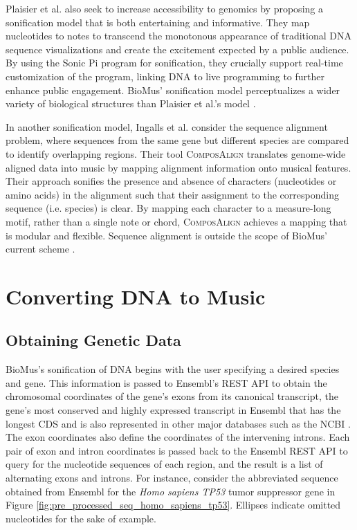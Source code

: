 \documentclass[letterpaper]{article}
\begin{document}
Plaisier et al. also seek to increase accessibility to genomics by proposing a sonification model that is both entertaining and informative. They map nucleotides to notes to transcend the monotonous appearance of traditional DNA sequence visualizations and create the excitement expected by a public audience. By using the Sonic Pi program for sonification, they crucially support real-time customization of the program, linking DNA to live programming to further enhance public engagement. BioMus’ sonification model perceptualizes a wider variety of biological structures than Plaisier et al.’s model \cite{plaisier_meagher_barker_2021}.

In another sonification model, Ingalls et al. consider the sequence alignment problem, where sequences from the same gene but different species are compared to identify overlapping regions. Their tool \textsc{ComposAlign} translates genome-wide aligned data into music by mapping alignment information onto musical features. Their approach sonifies the presence and absence of characters (nucleotides or amino acids) in the alignment such that their assignment to the corresponding sequence (i.e. species) is clear. By mapping each character to a measure-long motif, rather than a single note or chord, \textsc{ComposAlign} achieves a mapping that is modular and flexible. Sequence alignment is outside the scope of BioMus’ current scheme \cite{mci/Ingalls2009}. 

\section{Converting DNA to Music}
\subsection{Obtaining Genetic Data}
BioMus’s sonification of DNA begins with the user specifying a desired species and gene. This information is passed to Ensembl’s REST API to obtain the chromosomal coordinates of the gene’s exons from its canonical transcript, the gene’s most conserved and highly expressed transcript in Ensembl that has the longest CDS and is also represented in other major databases such as the NCBI \cite{ensembl_transcript_flags}. The exon coordinates also define the coordinates of the intervening introns. Each pair of exon and intron coordinates is passed back to the Ensembl REST API to query for the nucleotide sequences of each region, and the result is a list of alternating exons and introns. For instance, consider the abbreviated sequence obtained from Ensembl for the \textit{Homo sapiens TP53} tumor suppressor gene in Figure \ref{fig:pre_processed_seq_homo_sapiens_tp53}. Ellipses indicate omitted nucleotides for the sake of example.
\end{document}
